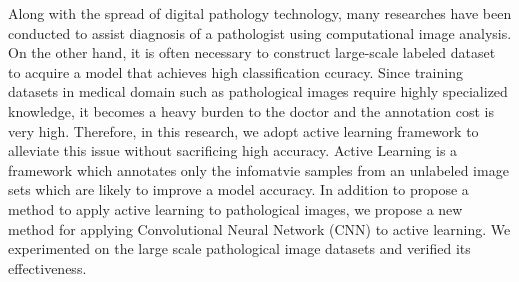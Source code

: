 Along with the spread of digital pathology technology, 
many researches have been conducted to assist diagnosis of a pathologist using computational image analysis.
On the other hand, it is often necessary to construct large-scale labeled dataset to acquire a model that achieves high classification ccuracy.
Since training datasets in medical domain such as pathological images require highly specialized knowledge, 
it becomes a heavy burden to the doctor and the annotation cost is very high.
Therefore, in this research, we adopt active learning framework to alleviate this issue without sacrificing high accuracy.
Active Learning is a framework which annotates only the infomatvie samples from an unlabeled image sets which are likely to improve a model accuracy.
In addition to propose a method to apply active learning to pathological images, 
we propose a new method for applying Convolutional Neural Network (CNN) to active learning.
We experimented on the large scale pathological image datasets and verified its effectiveness.
